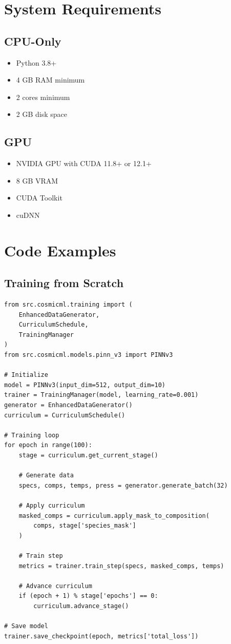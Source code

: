 \documentclass[12pt,a4paper,oneside]{report}
\begin{document}
\chapter{System Requirements}

\section{CPU-Only}

\begin{itemize}
    \item Python 3.8+
    \item 4 GB RAM minimum
    \item 2 cores minimum
    \item 2 GB disk space
\end{itemize}

\section{GPU}

\begin{itemize}
    \item NVIDIA GPU with CUDA 11.8+ or 12.1+
    \item 8 GB VRAM
    \item CUDA Toolkit
    \item cuDNN
\end{itemize}

\chapter{Code Examples}

\section{Training from Scratch}

\begin{lstlisting}
from src.cosmicml.training import (
    EnhancedDataGenerator,
    CurriculumSchedule,
    TrainingManager
)
from src.cosmicml.models.pinn_v3 import PINNv3

# Initialize
model = PINNv3(input_dim=512, output_dim=10)
trainer = TrainingManager(model, learning_rate=0.001)
generator = EnhancedDataGenerator()
curriculum = CurriculumSchedule()

# Training loop
for epoch in range(100):
    stage = curriculum.get_current_stage()

    # Generate data
    specs, comps, temps, press = generator.generate_batch(32)

    # Apply curriculum
    masked_comps = curriculum.apply_mask_to_composition(
        comps, stage['species_mask']
    )

    # Train step
    metrics = trainer.train_step(specs, masked_comps, temps)

    # Advance curriculum
    if (epoch + 1) % stage['epochs'] == 0:
        curriculum.advance_stage()

# Save model
trainer.save_checkpoint(epoch, metrics['total_loss'])
\end{lstlisting}
\end{document}
